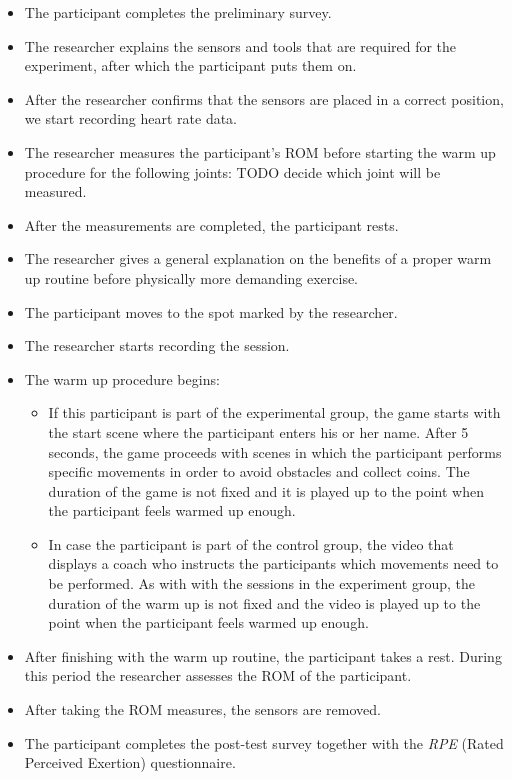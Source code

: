 \begin{itemize}
\item The participant completes the preliminary survey.
\item The researcher explains the sensors and tools that are required for the experiment, after which the participant puts them on. 
\item After the researcher confirms that the sensors are placed in a correct position, we start recording heart rate data.
\item The researcher measures the participant's ROM before starting the warm up procedure for the following joints: TODO decide which joint will be measured.
\item After the measurements are completed, the participant rests.
\item The researcher gives a general explanation on the benefits of a proper warm up routine before physically more demanding exercise.
\item The participant moves to the spot marked by the researcher.
\item The researcher starts recording the session. 
\item The warm up procedure begins:
\begin{itemize}
\item If this participant is part of the experimental group, the game starts with the start scene where the participant enters his or her name. After 5 seconds, the game proceeds with scenes in which the participant performs specific movements in order to avoid obstacles and collect coins. The duration of the game is not fixed and it is played up to the point when the participant feels warmed up enough. 
\item  In case the participant is part of the control group, the video that displays a coach who instructs the participants which movements need to be performed. As with with the sessions in the experiment group, the duration of the warm up is not fixed and the video is played up to the point when the participant feels warmed up enough.
\end{itemize}
\item After finishing with the warm up routine, the participant takes a rest. During this period the researcher assesses the ROM of the participant. 
\item After taking the ROM measures, the sensors are removed.
\item The participant completes the post-test survey together with the \textit{RPE} (Rated Perceived Exertion) questionnaire. %
\end{itemize}

